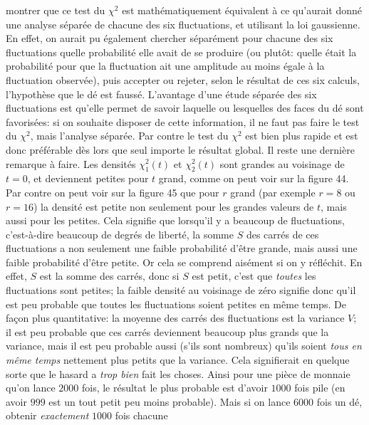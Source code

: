 montrer que ce test du $\chi^2$ est math\'ematiquement \'equivalent \`a 
ce qu'aurait donn\'e une analyse s\'epar\'ee de chacune des six
fluctuations, et utilisant la loi gaussienne. En effet, on aurait pu
\'egalement chercher s\'epar\'ement pour chacune des six fluctuations
quelle probabilit\'e elle avait de se produire (ou plut\^ot: quelle \'etait la
probabilit\'e pour que la fluctuation ait une amplitude au moins \'egale 
\`a la fluctuation observ\'ee), puis accepter ou rejeter, selon le r\'esultat 
de ces six calculs, l'hypoth\`ese que le d\'e est fauss\'e. L'avantage d'une
\'etude s\'epar\'ee des six fluctuations est qu'elle permet de savoir
laquelle ou lesquelles des faces du d\'e sont favoris\'ees: si on souhaite
disposer de cette information, il ne faut pas faire le test du $\chi^2$, 
mais l'analyse s\'epar\'ee. Par contre le test du $\chi^2$ est bien plus
rapide et est donc pr\'ef\'erable d\`es lors que seul importe le r\'esultat
global.
\medskip
Il reste une derni\`ere remarque \`a faire. Les densit\'es $\chi_1^2 (t)$ 
et $\chi_2^2 (t)$ sont grandes au voisinage de $t = 0$, et deviennent
petites pour $t$ grand, comme on peut voir sur la figure 44. Par contre
on peut voir sur la figure 45 que pour $r$ grand (par exemple $r =
8$ ou $r = 16$) la densit\'e est petite non seulement pour les grandes
valeurs de $t$, mais aussi pour les petites. Cela signifie que lorsqu'il y 
a beaucoup de fluctuations, c'est-\`a-dire beaucoup de degr\'es de
libert\'e,  la somme $S$ des carr\'es de ces fluctuations a non 
seulement une faible probabilit\'e d'\^etre grande, mais aussi une faible
probabilit\'e d'\^etre petite. Or cela se comprend ais\'ement si on y
r\'efl\'echit. En effet, $S$ est la somme des carr\'es, donc si $S$ est
petit, c'est que {\it toutes} les fluctuations sont petites; la faible
densit\'e au voisinage de z\'ero signifie donc qu'il est peu probable que
toutes les fluctuations soient petites en m\^eme temps. De fa\c{c}on
plus quantitative: la moyenne des carr\'es des fluctuations est la 
variance $V$; il est peu probable que ces carr\'es deviennent beaucoup 
plus grands que la variance, mais il est peu probable aussi (s'ils sont 
nombreux) qu'ils soient {\it tous en m\^eme temps} nettement plus
petits que la variance. Cela signifierait en quelque sorte que le hasard a
{\it trop bien} fait les choses. Ainsi pour une pi\`ece de monnaie qu'on
lance $2000$ fois, le r\'esultat le plus probable est d'avoir $1000$ fois
pile (en avoir $999$ est un tout petit peu moins probable). Mais si on
lance $6000$ fois un d\'e, obtenir {\it exactement} $1000$ fois chacune
